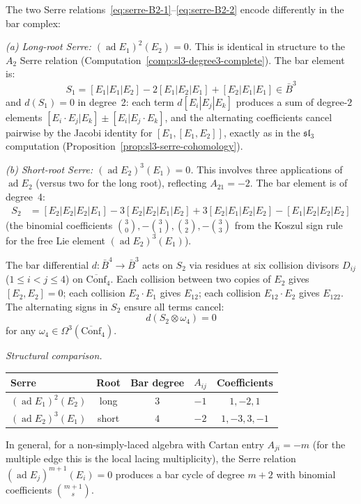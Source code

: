 \begin{computation}
\label{comp:B2-serre}

The two Serre relations~\eqref{eq:serre-B2-1}--\eqref{eq:serre-B2-2}
encode differently in the bar complex:

\emph{(a) Long-root Serre: $(\operatorname{ad} E_1)^2(E_2) = 0$.}
This is identical in structure to the $A_2$ Serre relation
(Computation~\ref{comp:sl3-degree3-complete}). The bar element is:
\[
S_1 = [E_1|E_1|E_2] - 2[E_1|E_2|E_1] + [E_2|E_1|E_1]
\in \bar{B}^3
\]
and $d(S_1) = 0$ in degree~2: each term $d[E_i|E_j|E_k]$ produces a sum of degree-$2$ elements $[E_i \cdot E_j | E_k] \pm [E_i | E_j \cdot E_k]$, and the alternating coefficients cancel pairwise by the Jacobi identity for $[E_1, [E_1, E_2]]$, exactly as in the $\mathfrak{sl}_3$ computation (Proposition~\ref{prop:sl3-serre-cohomology}).

\emph{(b) Short-root Serre: $(\operatorname{ad} E_2)^3(E_1) = 0$.}
This involves three applications of $\operatorname{ad} E_2$
(versus two for the long root), reflecting $A_{21} = -2$. The bar element
is of degree~4:
\begin{align*}
S_2 &= [E_2|E_2|E_2|E_1]
- 3[E_2|E_2|E_1|E_2]
+ 3[E_2|E_1|E_2|E_2]
- [E_1|E_2|E_2|E_2]
\end{align*}
(the binomial coefficients $\binom{3}{0}, -\binom{3}{1}, \binom{3}{2}, -\binom{3}{3}$ from the Koszul sign rule for the free Lie element $(\operatorname{ad} E_2)^3(E_1)$).

The bar differential $d\colon \bar{B}^4 \to \bar{B}^3$ acts on $S_2$
via residues at six collision divisors $D_{ij}$ ($1 \leq i < j \leq 4$)
on $\overline{\mathrm{Conf}}_4$. Each collision between two copies of $E_2$
gives $[E_2, E_2] = 0$; each collision $E_2 \cdot E_1$ gives $E_{12}$;
each collision $E_{12} \cdot E_2$ gives $E_{122}$. The alternating
signs in $S_2$ ensure all terms cancel:
\begin{equation}
d(S_2 \otimes \omega_4) = 0
\end{equation}
for any $\omega_4 \in \Omega^3(\overline{\mathrm{Conf}}_4)$.

\emph{Structural comparison.}
\begin{center}
\renewcommand{\arraystretch}{1.2}
\begin{tabular}{lcccc}
\textbf{Serre} & \textbf{Root} & \textbf{Bar degree} & \textbf{$A_{ij}$} &
\textbf{Coefficients} \\
\hline
$(\operatorname{ad} E_1)^2(E_2)$ & long & $3$ & $-1$ & $1, -2, 1$ \\
$(\operatorname{ad} E_2)^3(E_1)$ & short & $4$ & $-2$ & $1, -3, 3, -1$
\end{tabular}
\end{center}
In general, for a non-simply-laced algebra with Cartan entry $A_{ji} = -m$
(for the multiple edge this is the local lacing multiplicity), the Serre relation
$(\operatorname{ad} E_j)^{m+1}(E_i) = 0$ produces a bar cycle
of degree $m+2$ with binomial coefficients $\binom{m+1}{s}$.
\end{computation}

